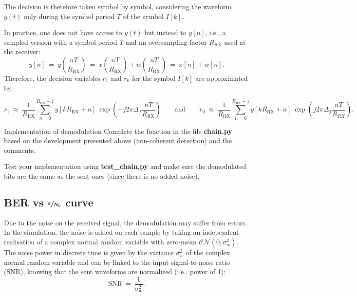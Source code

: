 The decision is therefore taken symbol by symbol, considering the waveform $y(t)$ only during the symbol period $T$ of the symbol $I[k]$.

In practice, one does not have access to $y(t)$ but instead to $y[n]$, i.e., a sampled version with a symbol period $T$ and an oversampling factor $R_{\text{RX}}$ used at the receiver:
\begin{equation*}
    y[n]\:=\:y\left(\frac{nT}{R_{\text{RX}}}\right)\:=\:x\left(\frac{nT}{R_{\text{RX}}}\right)+w\left(\frac{nT}{R_{\text{RX}}}\right)\:=\: x[n] + w[n].
\end{equation*}
Therefore, the decision variables $r_1$ and $r_0$ for the symbol $I[k]$ are approximated by:
\begin{small}
\begin{equation*}
    r_1\:\approx\:\frac{1}{R_{\text{RX}}}\sum_{n=0}^{R_{\text{RX}}-1} y[kR_{\text{RX}}+n] \:\exp \left(-j2\pi \Delta_f \frac{nT}{R_{\text{RX}}}\right)\qquad \text{and} \qquad r_0\:\approx\:\frac{1}{R_{\text{RX}}}\sum_{n=0}^{R_{\text{RX}}-1} y[kR_{\text{RX}}+n] \:\exp \left(j2\pi \Delta_f \frac{nT}{R_{RX}}\right).
\end{equation*}
\end{small}

\begin{bclogo}[couleur = gray!20, arrondi = 0.2, logo=\bccrayon]{Implementation of demodulation}
Complete the  function in the file \textbf{chain.py} based on the development presented above (non-coherent detection) and the comments.

Test your implementation using \textbf{test\_chain.py} and make sure the demodulated bits are the same as the sent ones (since there is no added noise).
\end{bclogo}

\subsection{BER vs $\boldsymbol{\sfrac{\varepsilon}{N_0}}$ curve}
Due to the noise on the received signal, the demodulation may suffer from errors. In the simulation, the noise is added on each sample by taking an independent realisation of a complex normal random variable with zero-mean $\mathcal{CN}(0,\sigma_w^2)$. The noise power in discrete time is given by the variance $\sigma_w^2$ of the complex normal random variable and can be linked to the input signal-to-noise ratio (SNR), knowing that the sent waveforms are normalized (i.e., power of 1):
\begin{equation*}
    \text{SNR}\:=\:\frac{1}{\sigma_w^2}.
\end{equation*}

